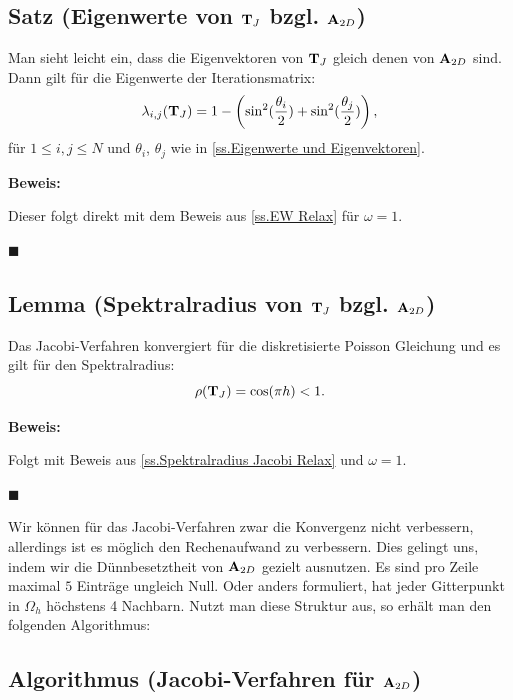 \subsection{Satz (Eigenwerte von ${\textbf{T}}_{J}$ bzgl. ${\textbf{A}}_{2D}$)}\label{ss.EW Jacobi}

Man sieht leicht ein, dass die Eigenvektoren von ${\textbf{T}}_{J}$ gleich denen von ${\textbf{A}}_{2D}$ sind. Dann gilt für die Eigenwerte der Iterationsmatrix:
\begin{equation}
\lambda_{i,j}({\textbf{T}}_{J}) = 1 - \left(\sin^{2}(\frac {\theta_{i}} {2}) + \sin^{2}(\frac {\theta_{j}} {2}) \right), \label{eq.Jacobi-Eigenwerte}
\end{equation}
für $1 \le i,j \le N$ und $\theta_{i}$, $\theta_{j}$ wie in \autoref{ss.Eigenwerte und Eigenvektoren}.

\textbf{Beweis:}\label{b.EW Jacobi}

Dieser folgt direkt mit dem Beweis aus \autoref{ss.EW Relax} für $\omega = 1$.
\begin{flushright}
$\blacksquare$
\end{flushright}

\subsection{Lemma (Spektralradius von ${\textbf{T}}_{J}$ bzgl. ${\textbf{A}}_{2D}$)}\label{ss.Spektralradius Jacobi}

Das Jacobi-Verfahren konvergiert für die diskretisierte Poisson Gleichung und es gilt für den Spektralradius:
\begin{equation}
\rho({\textbf{T}}_{J}) = \cos(\pi h) < 1.
\end{equation}

\textbf{Beweis:}\label{b.Spektral Jacobi}

Folgt mit Beweis aus \autoref{ss.Spektralradius Jacobi Relax} und $\omega = 1$.
\begin{flushright}
$\blacksquare$
\end{flushright}

Wir können für das Jacobi-Verfahren zwar die Konvergenz nicht verbessern, allerdings ist es möglich den Rechenaufwand zu verbessern. Dies gelingt uns, indem wir die Dünnbesetztheit von ${\textbf{A}}_{2D}$ gezielt ausnutzen. Es sind pro Zeile maximal $5$ Einträge ungleich Null. Oder anders formuliert, hat jeder Gitterpunkt in $\Omega_{h}$ höchstens 4 Nachbarn. Nutzt man diese Struktur aus, so erhält man den folgenden Algorithmus:

\subsection{Algorithmus (Jacobi-Verfahren für ${\textbf{A}}_{2D}$)}\label{ss.Jacobi für Poisson}

